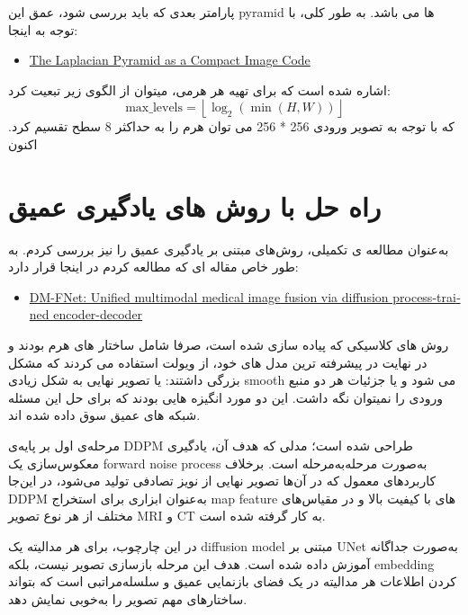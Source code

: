 \documentclass[a4paper,12pt]{article}
\begin{document}
پارامتر بعدی که باید بررسی شود، عمق این pyramid ها می باشد. به طور کلی، با توجه به اینجا:
\begin{latin}
	\begin{itemize}
		\item \href{https://ieeexplore.ieee.org/document/1095851}{The Laplacian Pyramid as a Compact Image Code}
	\end{itemize}
\end{latin}
اشاره شده است که برای تهیه هر هرمی، میتوان از الگوی زیر تبعیت کرد:
\[
\text{max\_levels} = \left\lfloor \log_2\left(\min(H, W)\right) \right\rfloor
\]
که با توجه به تصویر ورودی 256 * 256 می توان هرم را به حداکثر 8 سطح تقسیم کرد. 
اکنون 	


\pagebreak
\section*{راه حل با روش های یادگیری عمیق}

به‌عنوان مطالعه ی تکمیلی، روش‌های مبتنی بر یادگیری عمیق را نیز بررسی کردم. به طور خاص مقاله ای که مطالعه کردم در اینجا قرار دارد:

\begin{latin}
\begin{itemize}
\item \href{https://arxiv.org/html/2506.15218v1}{DM-FNet: Unified multimodal medical image fusion via diffusion process-trained encoder-decoder}
\end{itemize}
\end{latin}
 
 روش های کلاسیکی که پیاده سازی شده است، صرفا شامل ساختار های هرم بودند و در نهایت در پیشرفته ترین مدل های خود، از ویولت استفاده می کردند که مشکل بزرگی داشتند:
 یا تصویر نهایی به شکل زیادی smooth می شود و یا جزئیات هر دو منبع ورودی را نمیتوان نگه داشت.
 این دو مورد انگیزه هایی بودند که برای حل این مسئله شبکه های عمیق سوق داده شده اند.
 
 
 مرحله‌ی اول بر پایه‌ی DDPM طراحی شده است؛ مدلی که هدف آن، یادگیری معکوس‌سازی یک forward noise process به‌صورت مرحله‌به‌مرحله است. برخلاف کاربردهای معمول که در آن‌ها تصویر نهایی از نویز تصادفی تولید می‌شود، در این‌جا DDPM به‌عنوان ابزاری برای استخراج  map feature ‌های با کیفیت بالا و در مقیاس‌های مختلف از هر نوع تصویر MRI و CT به کار گرفته شده است.
 
 در این چارچوب، برای هر مدالیته یک diffusion model مبتنی بر UNet به‌صورت جداگانه آموزش داده شده است. هدف این مرحله بازسازی تصویر نیست، بلکه embedding کردن اطلاعات هر مدالیته در یک فضای بازنمایی عمیق و سلسله‌مراتبی است که بتواند ساختارهای مهم تصویر را به‌خوبی نمایش دهد.
 
\end{document}
